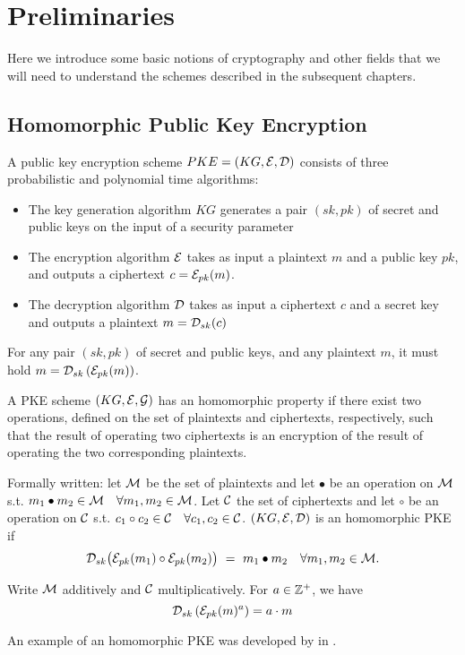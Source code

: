 \chapter{Preliminaries}
\label{chap:pre}
Here we introduce some basic notions of cryptography and other fields that we will need to understand the schemes described in the subsequent chapters.

\section{Homomorphic Public Key Encryption}
A public key encryption scheme $PKE = (KG, \mathcal{E}, \mathcal{D})$ consists of three probabilistic and polynomial time algorithms:
\begin{itemize}[align = left, leftmargin=*, label={--}]
\item The key generation algorithm $KG$ generates a pair $(sk,pk)$ of secret and public keys on the input of a security parameter
\item The encryption algorithm $\mathcal{E}$ takes as input a plaintext $m$ and a public key $pk$, and outputs a ciphertext $c = \mathcal{E}_{pk}(m)$.
\item The decryption algorithm $\mathcal{D}$ takes as input a ciphertext $c$ and a secret key and outputs a plaintext $m = \mathcal{D}_{sk}(c)$
\end{itemize}

For any pair $(sk,pk)$ of secret and public keys, and any plaintext $m$, it must hold $m = \mathcal{D}_{sk} \left( \mathcal{E}_{pk} (m) \right)$.

A PKE scheme $(KG,\mathcal{E},\mathcal{G})$ has an homomorphic property if there exist two operations, defined on the set of plaintexts and ciphertexts, respectively, such that the result of operating two ciphertexts is an encryption of the result of operating the two corresponding plaintexts.

Formally written: let $\mathcal{M}$ be the set of plaintexts and let $\bullet$ be an operation on $\mathcal{M}$ s.t. $m_1 \bullet m_2 \in \mathcal{M} \quad \forall m_1,m_2 \in \mathcal{M}$. Let $\mathcal{C}$ the set of ciphertexts and let $\circ$ be an operation on $\mathcal{C}$ s.t. $c_1 \circ c_2 \in \mathcal{C} \quad \forall c_1,c_2 \in \mathcal{C}$. $(KG,\mathcal{E},\mathcal{D})$ is an homomorphic PKE if
$$
\mathcal{D}_{sk} \big( \mathcal{E}_{pk}(m_1) \circ \mathcal{E}_{pk}(m_2) \big) \ = \ m_1 \bullet m_2 \quad \forall m_1,m_2 \in \mathcal{M}.
$$

Write $\mathcal{M}$ additively and $\mathcal{C}$ multiplicatively. For $a \in {\mathbb Z}^+$, we have $$\mathcal{D}_{sk} \left( \mathcal{E}_{pk} (m)^a \right) = a \cdot m$$

An example of an homomorphic PKE was developed by \citeauthor{elGamal85} in \cite{elGamal85}.

